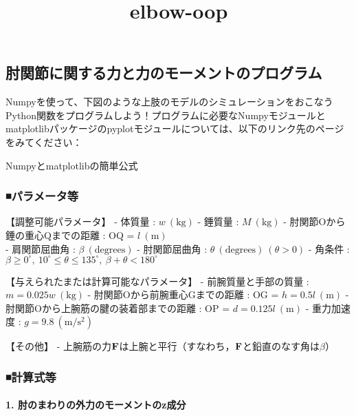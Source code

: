 \documentclass[11pt]{article}
\title{elbow-oop}
\begin{document}
    
    
    \maketitle
    
    

    
    \subsection{肘関節に関する力と力のモーメントのプログラム}\label{ux8098ux95a2ux7bc0ux306bux95a2ux3059ux308bux529bux3068ux529bux306eux30e2ux30fcux30e1ux30f3ux30c8ux306eux30d7ux30edux30b0ux30e9ux30e0}

Numpyを使って、下図のような上肢のモデルのシミュレーションをおこなうPython関数をプログラムしよう！プログラムに必要なNumpyモジュールとmatplotlibパッケージのpyplotモジュールについては、以下のリンク先のページをみてください：

Numpyとmatplotlibの簡単公式

\subsubsection{◾️パラメータ等}\label{ux30d1ux30e9ux30e1ux30fcux30bfux7b49}

【調整可能パラメータ】 - 体質量 : \(w\ (\mathrm{kg})\) - 錘質量 :
\(M\ (\mathrm{kg})\) - 肘関節Oから錘の重心Qまでの距離 : OQ =
\(l\ (\mathrm{m})\)\\
- 肩関節屈曲角 : \(\beta\ (\mathrm{degrees})\) - 肘関節屈曲角 :
\(\theta\ (\mathrm{degrees})\ (\theta>0)\) - 角条件 :
\(\beta\geq0^\circ,\ 10^\circ\leq\theta\leq135^\circ,\ \beta+\theta<180^\circ\)

【与えられたまたは計算可能なパラメータ】 - 前腕質量と手部の質量 :
\(m = 0.025w\ (\mathrm{kg})\) - 肘関節Oから前腕重心Gまでの距離 : OG =
\(h = 0.5l\ (\mathrm{m})\) - 肘関節Oから上腕筋の腱の装着部までの距離 :
OP = \(d=0.125l\ (\mathrm{m})\) - 重力加速度 :
\(g=9.8\ (\mathrm{m/s^2})\)

【その他】 -
上腕筋の力\(\bf{F}\)は上腕と平行（すなわち，\(\bf{F}\)と鉛直のなす角は\(\beta\)）

\subsubsection{◾️計算式等}\label{ux8a08ux7b97ux5f0fux7b49}

\paragraph{1.
肘のまわりの外力のモーメントのz成分}\label{ux8098ux306eux307eux308fux308aux306eux5916ux529bux306eux30e2ux30fcux30e1ux30f3ux30c8ux306ezux6210ux5206}
\end{document}
